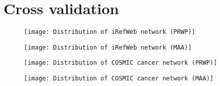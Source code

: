 \section{Cross validation}
\begin{figure}
    \label{fig:irefweb-prwp}
    \texttt{[image: Distribution of iRefWeb network (PRWP)]}
\end{figure}
\begin{figure}
    \label{fig:irefweb-maa}
    \texttt{[image: Distribution of iRefWeb network (MAA)]}
\end{figure}
\begin{figure}
    \label{fig:cosmic-prwp}
    \texttt{[image: Distribution of COSMIC cancer network (PRWP)]}
\end{figure}
\begin{figure}
    \label{fig:cosmic-maa}
    \texttt{[image: Distribution of COSMIC cancer network (MAA)]}
\end{figure}

